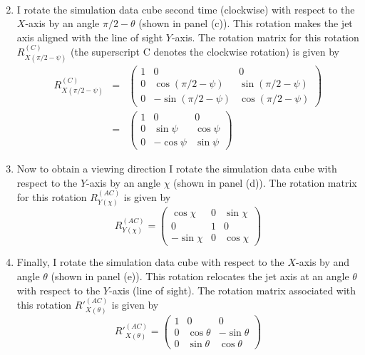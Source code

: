 \begin{appendices}
\begin{enumerate}
\begin{eqnarray}
\end{eqnarray}
\item I rotate the simulation data cube second time (clockwise) with respect to the $X$-axis by an angle $\pi/2 - \theta$ (shown in panel (c)). 
This rotation makes the jet axis aligned with the line of sight $Y$-axis. The rotation matrix for this rotation $R^{(C)}_{X(\pi/2 - \psi)}$ (the superscript C denotes the clockwise rotation) is given by 
\begin{eqnarray}
R^{(C)}_{X(\pi/2 - \psi)} &=& \begin{pmatrix}
 1 & 0 & 0 \\
0 & \cos(\pi/2 - \psi) & \sin(\pi/2 - \psi) \\
0 & -\sin(\pi/2 - \psi) & \cos(\pi/2 - \psi)
\end{pmatrix} \nonumber \\
& = &\begin{pmatrix}
1 & 0 & 0 \\
0 & \sin\psi & \cos\psi \\
0 & -\cos\psi & \sin\psi
\end{pmatrix}  
\end{eqnarray}
\item Now to obtain a viewing direction I rotate the simulation data cube with respect to the $Y$-axis by an angle $\chi$ (shown in panel (d)). 
The rotation matrix for this rotation $R^{(AC)}_{Y(\chi)} $ is given by
\begin{equation}
R^{(AC)}_{Y(\chi)} = \begin{pmatrix}
 \cos\chi & 0 & \sin\chi \\
0 & 1  & 0 \\
-\sin\chi & 0 & \cos\chi
\end{pmatrix}  
\end{equation}
\item Finally, I rotate the simulation data cube with respect to the $X$-axis by and angle $\theta$ (shown in panel (e)). This rotation relocates the jet axis at an angle $\theta$ with respect to the $Y$-axis (line of sight). 
The rotation matrix associated with this rotation $R'^{(AC)}_{X(\theta)}$ is given by
 \begin{equation}
  R'^{(AC)}_{X(\theta)} = \begin{pmatrix}
 1 & 0 & 0 \\
0 & \cos\theta & -\sin\theta \\
0 & \sin\theta & \cos\theta 
\end{pmatrix}  
\end{equation}
\end{enumerate} 


\end{appendices}
